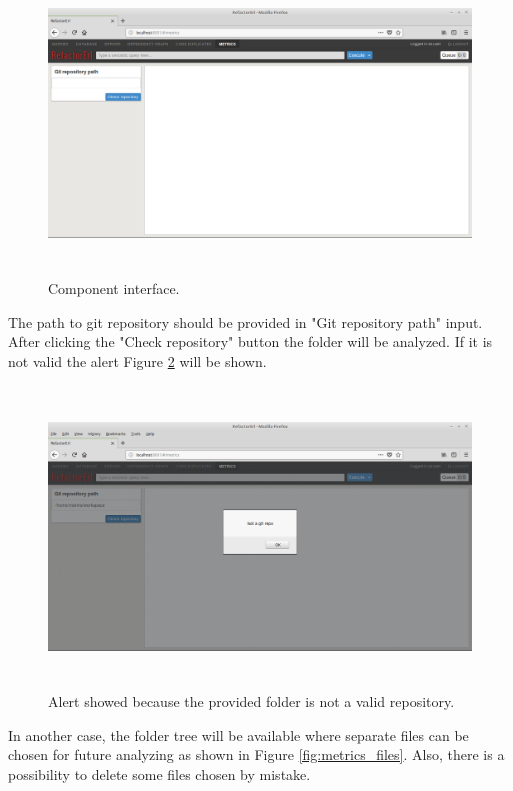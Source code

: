\begin{figure}[ht]
	\includegraphics[height=80mm]{figures/metrics.png}
	\caption{Component interface.}
	\label{fig:interface}
\end{figure}

The path to git repository should be provided in "Git repository path" input. After clicking the "Check repository" button the folder will be analyzed. If it is not valid the alert Figure \ref{fig:metrics_alert} will be shown.  

\begin{figure}[ht]
	\includegraphics[height=80mm]{figures/alert.png}
	\caption{Alert showed because the provided folder is not a valid repository.}
	\label{fig:metrics_alert}
\end{figure}

In another case, the folder tree will be available where separate files can be chosen for future analyzing as shown in Figure \ref{fig:metrics_files}. Also, there is a possibility to delete some files chosen by mistake.

